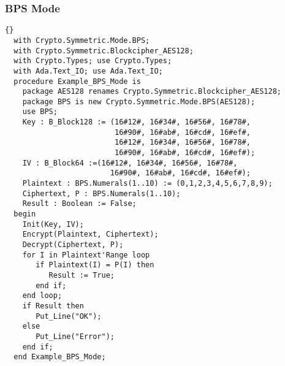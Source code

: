 \subsubsection*{BPS Mode}
\begin{lstlisting}{}
  with Crypto.Symmetric.Mode.BPS;
  with Crypto.Symmetric.Blockcipher_AES128;
  with Crypto.Types; use Crypto.Types;
  with Ada.Text_IO; use Ada.Text_IO;
  procedure Example_BPS_Mode is
    package AES128 renames Crypto.Symmetric.Blockcipher_AES128;
    package BPS is new Crypto.Symmetric.Mode.BPS(AES128);
    use BPS;
    Key : B_Block128 := (16#12#, 16#34#, 16#56#, 16#78#,
	  	                 16#90#, 16#ab#, 16#cd#, 16#ef#,
		                 16#12#, 16#34#, 16#56#, 16#78#,
		                 16#90#, 16#ab#, 16#cd#, 16#ef#);
    IV : B_Block64 :=(16#12#, 16#34#, 16#56#, 16#78#,
		                16#90#, 16#ab#, 16#cd#, 16#ef#);
    Plaintext : BPS.Numerals(1..10) := (0,1,2,3,4,5,6,7,8,9);
    Ciphertext, P : BPS.Numerals(1..10);
    Result : Boolean := False;
  begin
    Init(Key, IV);
    Encrypt(Plaintext, Ciphertext);
    Decrypt(Ciphertext, P);
    for I in Plaintext'Range loop
       if Plaintext(I) = P(I) then
          Result := True;
       end if;
    end loop;
    if Result then
       Put_Line("OK");
    else
       Put_Line("Error"); 
    end if;
  end Example_BPS_Mode;
\end{lstlisting}